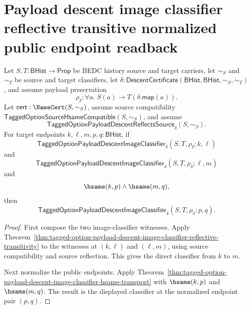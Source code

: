 \section{Payload descent image classifier reflective transitive normalized public endpoint readback}
\label{sec:option-image-classifier-reflective-transitive-normalized-public-endpoint-readback}

\begin{theorem}
\label{thm:tagged-option-payload-descent-image-classifier-reflective-transitive-normalized-image-closure}
Let $S,T:\mathsf{BHist}\to\mathsf{Prop}$ be BEDC history source and target
carriers, let $\sim_S$ and $\sim_T$ be source and target classifiers, let
$\delta:\mathsf{DescentCertificate}(\mathsf{BHist},\mathsf{BHist},\sim_S,\sim_T)$,
and assume payload preservation
$$
\rho_{\delta}:\forall a.\;S(a)\to T(\delta.\mathsf{map}(a)).
$$
Let $\mathsf{cert}:\NameCert(S,\sim_S)$, assume source compatibility
$\mathsf{TaggedOptionSourceHsameCompatible}(S,\sim_S)$, and assume
$$
\mathsf{TaggedOptionPayloadDescentReflectsSource}_{\delta}(S,\sim_S).
$$
For target endpoints $k,\ell,m,p,q:\mathsf{BHist}$, if
$$
\mathsf{TaggedOptionPayloadDescentImageClassifier}_{\delta}
(S,T,\rho_{\delta};k,\ell)
$$
and
$$
\mathsf{TaggedOptionPayloadDescentImageClassifier}_{\delta}
(S,T,\rho_{\delta};\ell,m)
$$
and
$$
\hsame(k,p)\land \hsame(m,q),
$$
then
$$
\mathsf{TaggedOptionPayloadDescentImageClassifier}_{\delta}
(S,T,\rho_{\delta};p,q).
$$
\end{theorem}
\begin{proof}
First compose the two image-classifier witnesses. Apply
Theorem~\ref{thm:tagged-option-payload-descent-image-classifier-reflective-transitivity}
to the witnesses at $(k,\ell)$ and $(\ell,m)$, using source compatibility and
source reflection. This gives the direct classifier from $k$ to $m$.

Next normalize the public endpoints. Apply
Theorem~\ref{thm:tagged-option-payload-descent-image-classifier-hsame-transport}
with $\hsame(k,p)$ and $\hsame(m,q)$. The result is the displayed classifier at
the normalized endpoint pair $(p,q)$.
\end{proof}

